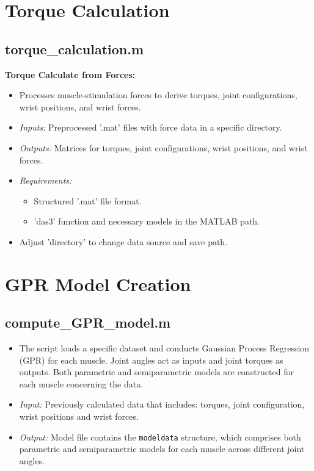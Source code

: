 \section{Torque Calculation}
\subsection{torque\_calculation.m}
\textbf{Torque Calculate from Forces:}

\begin{itemize}
    \item Processes muscle-stimulation forces to derive torques, joint configurations, wrist positions, and wrist forces.
    \item \textit{Inputs:} Preprocessed '.mat' files with force data in a specific directory.
    \item \textit{Outputs:} Matrices for torques, joint configurations, wrist positions, and wrist forces.
    \item \textit{Requirements:} 
    \begin{itemize}
        \item Structured '.mat' file format.
        \item 'das3' function and necessary models in the MATLAB path.
    \end{itemize}
    \item Adjust 'directory' to change data source and save path.
\end{itemize}

\section{GPR Model Creation}
\subsection{compute\_GPR\_model.m}
\begin{itemize}
    \item The script loads a specific dataset and conducts Gaussian Process Regression (GPR) for each muscle. Joint angles act as inputs and joint torques as outputs. Both parametric and semiparametric models are constructed for each muscle concerning the data.
    \item \textit{Input:} Previously calculated data that includes: torques, joint configuration, wrist positions and wrist forces.
    \item \textit{Output:} Model file contains the \texttt{modeldata} structure, which comprises both parametric and semiparametric models for each muscle across different joint angles. 
\end{itemize}